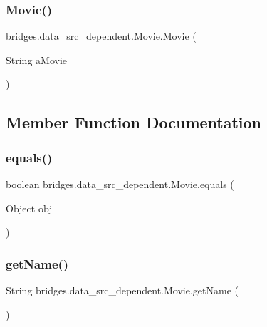 \subsubsection{\texorpdfstring{Movie()}{Movie()}}
{\footnotesize\ttfamily bridges.\+data\+\_\+src\+\_\+dependent.\+Movie.\+Movie (\begin{DoxyParamCaption}\item[{String}]{a\+Movie }\end{DoxyParamCaption})}



\subsection{Member Function Documentation}
\hypertarget{classbridges_1_1data__src__dependent_1_1_movie_afc8150c86e72b35eedd7885ec0edab98}{}\label{classbridges_1_1data__src__dependent_1_1_movie_afc8150c86e72b35eedd7885ec0edab98} 
\subsubsection{\texorpdfstring{equals()}{equals()}}
{\footnotesize\ttfamily boolean bridges.\+data\+\_\+src\+\_\+dependent.\+Movie.\+equals (\begin{DoxyParamCaption}\item[{Object}]{obj }\end{DoxyParamCaption})}

\hypertarget{classbridges_1_1data__src__dependent_1_1_movie_a168439a5933e62c95db1d86b8d85dba7}{}\label{classbridges_1_1data__src__dependent_1_1_movie_a168439a5933e62c95db1d86b8d85dba7} 
\subsubsection{\texorpdfstring{get\+Name()}{getName()}}
{\footnotesize\ttfamily String bridges.\+data\+\_\+src\+\_\+dependent.\+Movie.\+get\+Name (\begin{DoxyParamCaption}{ }\end{DoxyParamCaption})}

